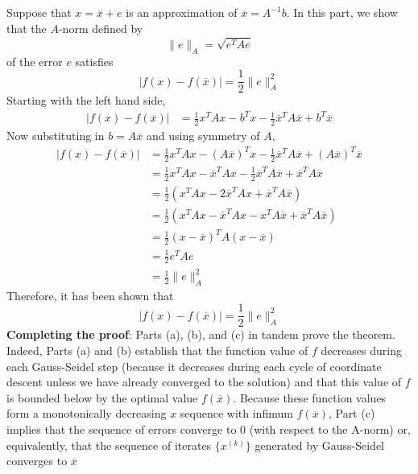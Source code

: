 \documentclass[11pt]{article} %
\begin{document}
\subsection{} %
Suppose that $x = \overline{x} + e$ is an approximation of $\overline{x} = A^{-1} b$. In this part, we show that the $A$-norm defined by 
\begin{equation}
\|e\|_A = \sqrt{e^T A e}
\end{equation}
of the error $e$ satisfies
\begin{equation}
| f(x) - f(\overline{x}) | = \frac{1}{2} \| e \|^2_A
\end{equation}
Starting with the left hand side,
\begin{equation}
\begin{split}
| f(x) - f(\overline{x}) | & = \frac{1}{2} x^T A x - b^T x - \frac{1}{2} \overline{x} ^T A \overline{x} + b^T \overline{x}
\end{split}
\end{equation}
Now substituting in $b=A \overline{x} $ and using symmetry of $A$,
\begin{equation}
\begin{split}
| f(x) - f(\overline{x}) | &= \frac{1}{2} x^T A x - (A \overline{x})^T x - \frac{1}{2} \overline{x}^T  A \overline{x} + (A \overline{x})^T \overline{x} \\
& = \frac{1}{2} x^T A x -  \overline{x}^T A x - \frac{1}{2} \overline{x}^T A \overline{x} + \overline{x}^T A \overline{x} \\
& = \frac{1}{2}\left ( x^T A x - 2  \overline{x}^T A x +  \overline{x}^T A \overline{x}\right  ) \\
& = \frac{1}{2}\left ( x^T A x -   \overline{x}^T A x - x^T A \overline{x} +  \overline{x}^T A \overline{x}\right  )\\
&= \frac{1}{2} (x- \overline{x})^T A (x-\overline{x}) \\
&=\frac{1}{2} e^T A e\\
&=\frac{1}{2}\|e\|_A ^2
\end{split}
\end{equation}
Therefore, it has been shown that
\begin{equation}
\boxed{| f(x) - f(\overline{x}) | = \frac{1}{2} \| e \|^2_A}
\end{equation}
\textbf{Completing the proof}: Parts (a), (b), and (c) in tandem prove the theorem. Indeed, Parts (a) and (b)
establish that the function value of $f$ decreases during each Gauss-Seidel step (because it decreases during each cycle of coordinate descent unless we have already converged to the solution) and that this value of $f$ is bounded below by the optimal value $f ( \overline{x})$. Because these function values form a monotonically decreasing $x$ sequence with infimum $f(\overline{x})$, Part (c) implies that the sequence of errors converge to 0 (with respect to the A-norm) or, equivalently, that the sequence of iterates $\{x^{(k)}\} $ generated by Gauss-Seidel converges to $\overline{x}$
\end{document}
